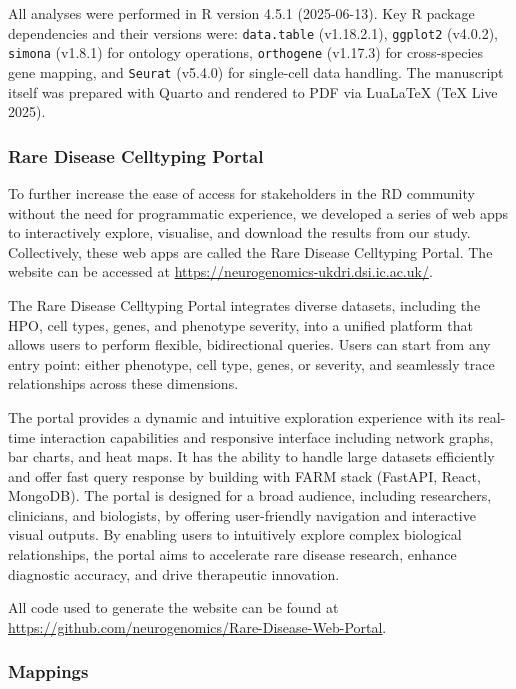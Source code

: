 \documentclass[
]{article}
\begin{document}
All analyses were performed in R version 4.5.1 (2025-06-13). Key R
package dependencies and their versions were: \texttt{data.table}
(v1.18.2.1), \texttt{ggplot2} (v4.0.2), \texttt{simona} (v1.8.1) for
ontology operations, \texttt{orthogene} (v1.17.3) for cross-species gene
mapping, and \texttt{Seurat} (v5.4.0) for single-cell data handling. The
manuscript itself was prepared with Quarto and rendered to PDF via
LuaLaTeX (TeX Live 2025).

\subsubsection{Rare Disease Celltyping
Portal}\label{rare-disease-celltyping-portal}

To further increase the ease of access for stakeholders in the RD
community without the need for programmatic experience, we developed a
series of web apps to interactively explore, visualise, and download the
results from our study. Collectively, these web apps are called the Rare
Disease Celltyping Portal. The website can be accessed at
\url{https://neurogenomics-ukdri.dsi.ic.ac.uk/}.

The Rare Disease Celltyping Portal integrates diverse datasets,
including the HPO, cell types, genes, and phenotype severity, into a
unified platform that allows users to perform flexible, bidirectional
queries. Users can start from any entry point: either phenotype, cell
type, genes, or severity, and seamlessly trace relationships across
these dimensions.

The portal provides a dynamic and intuitive exploration experience with
its real-time interaction capabilities and responsive interface
including network graphs, bar charts, and heat maps. It has the ability
to handle large datasets efficiently and offer fast query response by
building with FARM stack (FastAPI, React, MongoDB). The portal is
designed for a broad audience, including researchers, clinicians, and
biologists, by offering user-friendly navigation and interactive visual
outputs. By enabling users to intuitively explore complex biological
relationships, the portal aims to accelerate rare disease research,
enhance diagnostic accuracy, and drive therapeutic innovation.

All code used to generate the website can be found at
\url{https://github.com/neurogenomics/Rare-Disease-Web-Portal}.

\subsubsection{Mappings}\label{mappings}
\end{document}
